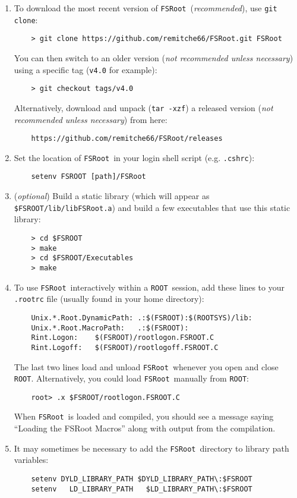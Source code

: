 \documentclass[11pt]{article}
\newcommand{\FSR}{{\tt FSRoot}}
\newcommand{\ROOT}{{\tt ROOT}}
\begin{document}
\begin{enumerate}

\item To download the most recent version of \FSR\ ({\it recommended}), use {\tt git clone}:
\begin{verbatim}
    > git clone https://github.com/remitche66/FSRoot.git FSRoot
\end{verbatim}
You can then switch to an older version ({\it not recommended unless necessary})
using a specific tag ({\tt v4.0} for example):
\begin{verbatim}
    > git checkout tags/v4.0
\end{verbatim}
Alternatively, download and unpack ({\tt tar -xzf}) a released version ({\it not recommended unless necessary}) from here:
\begin{verbatim}
    https://github.com/remitche66/FSRoot/releases
\end{verbatim}


\item Set the location of \FSR\ in your login shell script (e.g. {\tt .cshrc}):
\begin{verbatim}
    setenv FSROOT [path]/FSRoot
\end{verbatim}

\item ({\it optional}) Build a static library (which will appear as {\tt \$FSROOT/lib/libFSRoot.a}) and build a few executables that use this static library:
\begin{verbatim}
    > cd $FSROOT
    > make
    > cd $FSROOT/Executables
    > make
\end{verbatim}
 

\item To use \FSR\ interactively within a \ROOT\ session, add these lines to your {\tt .rootrc} file (usually found in your home directory):
\begin{verbatim}
    Unix.*.Root.DynamicPath: .:$(FSROOT):$(ROOTSYS)/lib:
    Unix.*.Root.MacroPath:   .:$(FSROOT):
    Rint.Logon:    $(FSROOT)/rootlogon.FSROOT.C
    Rint.Logoff:   $(FSROOT)/rootlogoff.FSROOT.C
\end{verbatim}
The last two lines load and unload \FSR\ whenever you open and close \ROOT.
Alternatively, you could load \FSR\ manually from \ROOT:
\begin{verbatim}
    root> .x $FSROOT/rootlogon.FSROOT.C
\end{verbatim}
When \FSR\ is loaded and compiled, you should see a message saying ``Loading the FSRoot Macros'' along with output from the compilation.  

\item It may sometimes be necessary to add the \FSR\ directory to library path variables:
\begin{verbatim}
    setenv DYLD_LIBRARY_PATH $DYLD_LIBRARY_PATH\:$FSROOT
    setenv   LD_LIBRARY_PATH   $LD_LIBRARY_PATH\:$FSROOT
\end{verbatim}

\end{enumerate}
\end{document}
